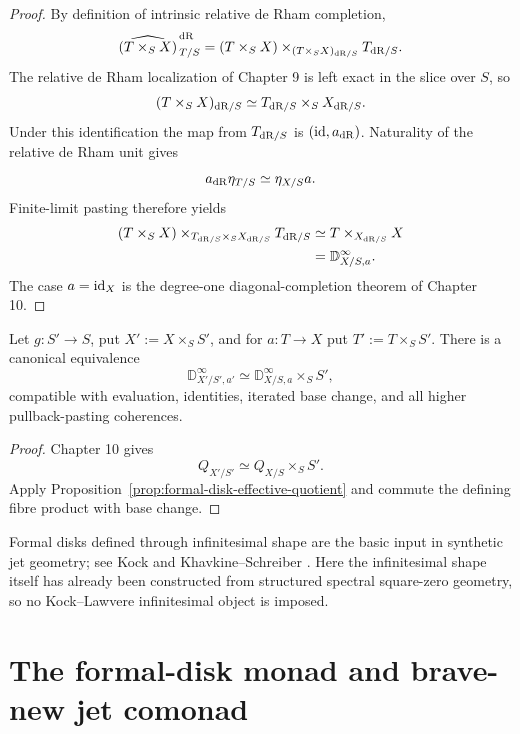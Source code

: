 \begin{proof}
By definition of intrinsic relative de Rham completion,
\[
    \widehat{(T\times_SX)}^{\,\mathrm{dR}}_{\,T/S}
    =
    (T\times_SX)
    \times_{(T\times_SX)_{\mathrm{dR}/S}}
    T_{\mathrm{dR}/S}.
\]
The relative de Rham localization of Chapter 9 is left exact in the slice over $S$, so
\[
    (T\times_SX)_{\mathrm{dR}/S}
    \simeq
    T_{\mathrm{dR}/S}\times_SX_{\mathrm{dR}/S}.
\]
Under this identification the map from $T_{\mathrm{dR}/S}$ is $(\operatorname{id},a_{\mathrm{dR}})$.  Naturality of the relative de Rham unit gives
\[
    a_{\mathrm{dR}}\eta_{T/S}\simeq\eta_{X/S}a.
\]
Finite-limit pasting therefore yields
\[
\begin{aligned}
(T\times_SX)
\times_{T_{\mathrm{dR}/S}\times_SX_{\mathrm{dR}/S}}
T_{\mathrm{dR}/S}
&\simeq
T\times_{X_{\mathrm{dR}/S}}X\\
&=
\mathbb D^\infty_{X/S,a}.
\end{aligned}
\]
The case $a=\operatorname{id}_X$ is the degree-one diagonal-completion theorem of Chapter 10.
\end{proof}

\begin{proposition}
\label{prop:formal-disk-base-change}
Let $g:S'\to S$, put $X':=X\times_SS'$, and for $a:T\to X$ put $T':=T\times_SS'$.  There is a canonical equivalence
\[
    \mathbb D^\infty_{X'/S',a'}
    \simeq
    \mathbb D^\infty_{X/S,a}\times_SS',
\]
compatible with evaluation, identities, iterated base change, and all higher pullback-pasting coherences.
\end{proposition}

\begin{proof}
Chapter 10 gives
\[
    Q_{X'/S'}\simeq Q_{X/S}\times_SS'.
\]
Apply Proposition~\ref{prop:formal-disk-effective-quotient} and commute the defining fibre product with base change.
\end{proof}

\begin{remark}
Formal disks defined through infinitesimal shape are the basic input in synthetic jet geometry; see Kock \cite{Kock1980} and Khavkine--Schreiber \cite{KhavkineSchreiber2017}.  Here the infinitesimal shape itself has already been constructed from structured spectral square-zero geometry, so no Kock--Lawvere infinitesimal object is imposed.
\end{remark}

\section{The formal-disk monad and brave-new jet comonad}
\label{sec:formal-disk-monad}
\label{sec:jet-bundle}

